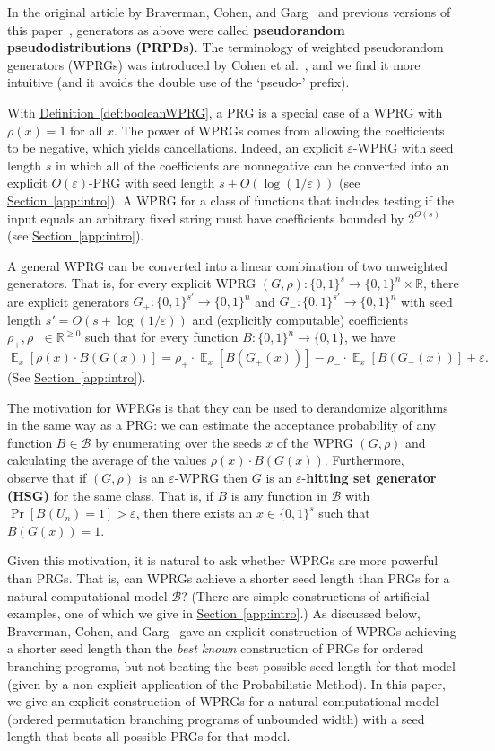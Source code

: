 \documentclass[11pt]{article}
\numberwithin{equation}{section}
\theoremstyle{definition}
\theoremstyle{plain}
\newcommand{\R}{\mathbb R}
\newcommand{\expref}[2]{\hyperref[#2]{#1~\ref{#2}}}
\newcommand{\eps}{\varepsilon}
\newcommand{\zo}{\{0,1\}}
\newcommand{\cB}{\mathcal{B}}
\DeclareMathOperator*{\E}{\mathbb{E}}
\begin{document}
In the original %
article by %
Braverman, Cohen, and Garg~\cite{BravermanCoGa18} and previous versions of this paper~\cite{PyneVa20}, generators as above were called \textbf{pseudorandom pseudodistributions (PRPDs)}.  The terminology of weighted pseudorandom generators (WPRGs) was introduced
by Cohen et al.~\cite{CohenDoReSbTa21}, and we find it more intuitive
(and it avoids the double use of the `pseudo-' prefix).

With \expref{Definition}{def:booleanWPRG}, a PRG is a special case of a WPRG with $\rho(x)=1$ for all $x$.  The power of WPRGs comes from allowing the coefficients
to be negative, which yields cancellations.  Indeed, an explicit $\eps$-WPRG with seed length $s$ in which all of the coefficients are nonnegative can be converted into an explicit $O(\eps)$-PRG with seed length $s+O(\log(1/\eps))$ (see \expref{Section}{app:intro}). A WPRG for a class of functions that includes testing if the input equals an arbitrary fixed string must have coefficients bounded by $2^{O(s)}$ (see \expref{Section}{app:intro}).

A general WPRG can be converted into a linear combination of two unweighted generators. That is, for every explicit WPRG 
$(G,\rho) \colon \zo^s \to \zo^n\times \R$, there are 
explicit generators $G_+ : \zo^{s'}\rightarrow \zo^n$ and $G_- : \zo^{s'}\rightarrow \zo^n$ with seed length
$s'=O(s+\log(1/\eps))$ and (explicitly computable) coefficients $\rho_+,\rho_-\in \R^{\geq 0}$ such that for every function $B : \zo^n\rightarrow \zo$, we have %
$$\E_x[\rho(x)\cdot B(G(x))] = 
\rho_+\cdot \E_x\left[B(G_+(x))\right] - \rho_-\cdot \E_x\left[B(G_-(x))\right]\pm \eps.$$
(See \expref{Section}{app:intro}).

The motivation for WPRGs is that they can be used to derandomize algorithms in the same way as a PRG:
we can estimate the acceptance probability of any function $B\in \cB$ by enumerating over the seeds $x$ of the WPRG $(G,\rho)$ and calculating the average of the values $\rho(x)\cdot B(G(x))$.
Furthermore, ~\cite{BravermanCoGa18} observe that if $(G,\rho)$ is an $\eps$-WPRG then $G$ is an $\eps$-\textbf{hitting set generator (HSG)} for the same class.  That is, if $B$ is any function in $\cB$ with $\Pr[B(U_n)=1]>\eps$, then there exists an $x\in \zo^s$ such that $B(G(x))=1$.

Given this motivation, it is natural to ask whether WPRGs are more powerful than PRGs.  That is, can WPRGs achieve a shorter seed length than PRGs for a natural computational model $\cB$?  (There are simple constructions of artificial examples, one of which we give in \expref{Section}{app:intro}.) 
As discussed below, Braverman, Cohen, and Garg~\cite{BravermanCoGa18} gave an explicit construction of WPRGs achieving a shorter seed length than the \emph{best known} construction of PRGs for ordered branching programs, but not beating the best possible seed length for that model (given by a non-explicit application of the Probabilistic Method). In this %
paper,  %
we give an explicit construction of WPRGs for a natural computational model (ordered permutation branching programs of unbounded width) with a
seed length that beats all possible PRGs for that model. 
\end{document}
